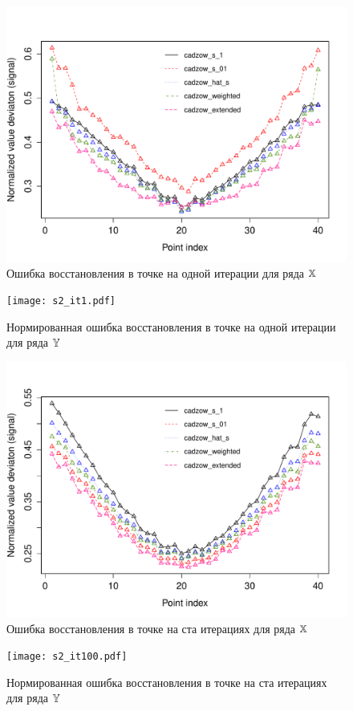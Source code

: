 \documentclass[12pt,a4paper,fleqn,leqno]{article}
\begin{document}
\begin{figure}[!h] \begin{center}
\includegraphics[width = 15cm]{s1_it1.pdf}\caption{Ошибка восстановления в точке на одной итерации для ряда $\mathbb{X}$}
\end{center}\end{figure}
\begin{figure}[!h] \begin{center}
\texttt{[image: s2\_it1.pdf]}\caption{Нормированная ошибка восстановления в точке на одной итерации для ряда $\mathbb{Y}$}
\end{center}\end{figure}
\begin{figure}[!h] \begin{center}
\includegraphics[width = 15cm]{s1_it100.pdf}\caption{Ошибка восстановления в точке на ста итерациях для ряда $\mathbb{X}$}
\end{center}\end{figure}
\begin{figure}[!h] \begin{center}
\texttt{[image: s2\_it100.pdf]}\caption{Нормированная ошибка восстановления в точке на ста итерациях для ряда $\mathbb{Y}$}
\end{center}\end{figure}
\end{document}
